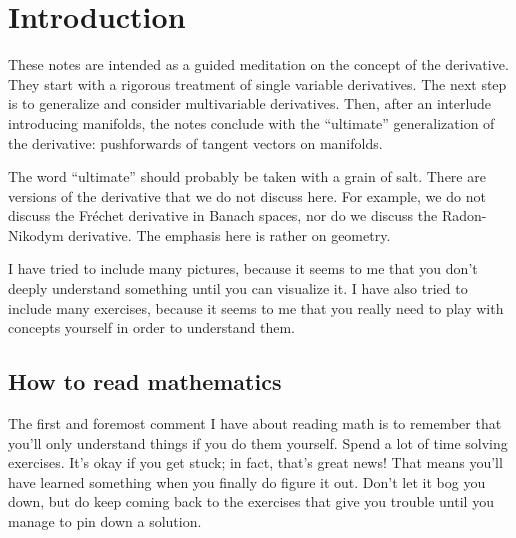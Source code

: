 \chapter*{Introduction}

These notes are intended as a guided meditation on the concept of the derivative. They start with a rigorous treatment of single variable derivatives. The next step is to generalize and consider multivariable derivatives. Then, after an interlude introducing manifolds, the notes conclude with the ``ultimate'' generalization of the derivative: pushforwards of tangent vectors on manifolds.

The word ``ultimate'' should probably be taken with a grain of salt. There are versions of the derivative that we do not discuss here. For example, we do not discuss the Fr\'echet derivative in Banach spaces, nor do we discuss the Radon-Nikodym derivative. The emphasis here is rather on geometry. 

I have tried to include many pictures, because it seems to me that you don't deeply understand something until you can visualize it. I have also tried to include many exercises, because it seems to me that you really need to play with concepts yourself in order to understand them. 

\section*{How to read mathematics}

The first and foremost comment I have about reading math is to remember that you'll only understand things if you do them yourself. Spend a lot of time solving exercises. It's okay if you get stuck; in fact, that's great news! That means you'll have learned something when you finally do figure it out. Don't let it bog you down, but do keep coming back to the exercises that give you trouble until you manage to pin down a solution. 


